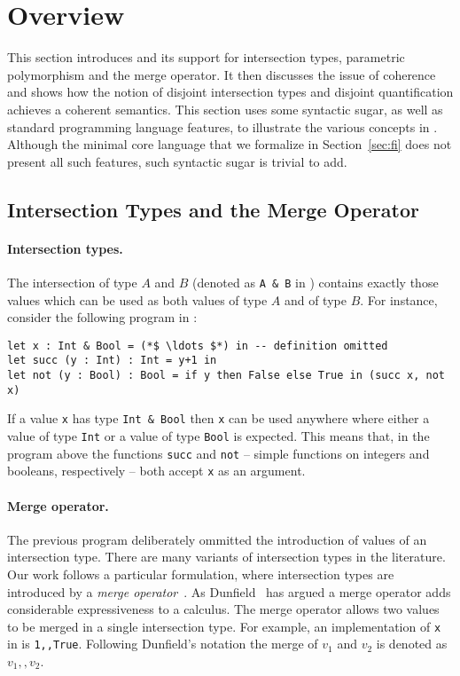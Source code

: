 \section{Overview} \label{sec:overview}

This section introduces \name and its support for intersection types,
parametric polymorphism and the merge operator. 
It then discusses the issue of coherence and shows how the notion of disjoint
intersection types and disjoint quantification achieves a coherent semantics.
This section uses some syntactic sugar, as well as standard
programming language features, to illustrate the various concepts in \name. 
Although the minimal core language that we formalize in
Section~\ref{sec:fi} does not present all such features, such
syntactic sugar is trivial to add.

\subsection{Intersection Types and the Merge Operator}

\paragraph{Intersection types.}
The intersection of type $A$ and $B$ (denoted as \lstinline{A & B} in
\name) contains exactly those values
which can be used as both values of type $A$ and of type $B$. 
For instance, consider the following program in \name:

\begin{lstlisting}
let x : Int & Bool = (*$ \ldots $*) in -- definition omitted
let succ (y : Int) : Int = y+1 in
let not (y : Bool) : Bool = if y then False else True in (succ x, not x)
\end{lstlisting}

\noindent If a value \lstinline{x} has type \lstinline{Int & Bool} then
\lstinline{x} can be used anywhere where either a value of type \lstinline{Int} or  
a value of type \lstinline{Bool} is expected. 
This means that, in the program above
the functions \lstinline{succ} and \lstinline{not} -- simple functions 
on integers and booleans, respectively -- both accept \lstinline{x} as an argument. 

\paragraph{Merge operator.}
The previous program deliberately ommitted the introduction of values of an
intersection type. 
There are many variants of intersection types in the literature. 
Our work follows a particular
formulation, where
intersection types are introduced by a \emph{merge operator}~\cite{reynolds1997design,reynolds1991coherence,Castagna92calculus,dunfield2014elaborating,oliveira16disjoint}. 
As Dunfield~\cite{dunfield2014elaborating} has argued a merge operator adds considerable
expressiveness to a calculus. 
The merge operator allows two values to be merged in a single intersection type. 
For example, an implementation of \lstinline{x} in \name is \lstinline{1,,True}.
Following Dunfield's notation the merge of $v_1$ and $v_2$ is denoted as $v_1 ,, v_2$.

